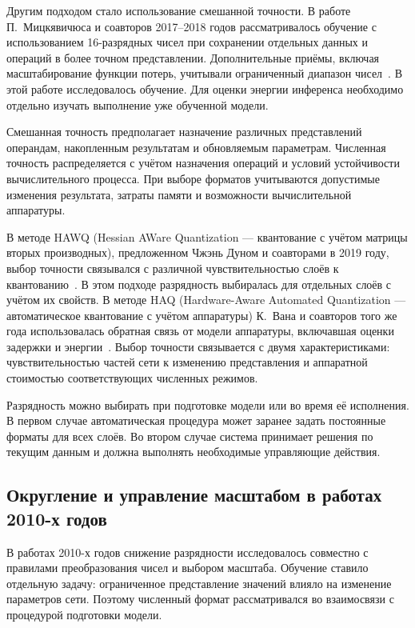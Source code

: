 Другим подходом стало использование смешанной точности. В работе
П.~Мицкявичюса и соавторов 2017--2018 годов рассматривалось
обучение с использованием 16-разрядных чисел при сохранении
отдельных данных и операций в более точном представлении.
Дополнительные приёмы, включая масштабирование функции потерь,
учитывали ограниченный диапазон чисел~\cite{mixed2018}.
В этой работе исследовалось обучение. Для оценки энергии инференса необходимо
отдельно изучать выполнение уже обученной модели.

Смешанная точность предполагает назначение различных представлений
операндам, накопленным результатам и обновляемым параметрам.
Численная точность распределяется с учётом назначения операций
и условий устойчивости вычислительного процесса. При выборе форматов учитываются допустимые изменения результата, затраты
памяти и возможности вычислительной аппаратуры.

В методе HAWQ (Hessian AWare Quantization — квантование с учётом
матрицы вторых производных), предложенном Чжэнь Дуном и соавторами
в 2019 году, выбор точности связывался с различной
чувствительностью слоёв к квантованию~\cite{hawq2019}.
В этом подходе разрядность выбиралась для отдельных слоёв
с учётом их свойств. В методе HAQ
(Hardware-Aware Automated Quantization — автоматическое квантование
с учётом аппаратуры) К.~Вана и соавторов того же года использовалась
обратная связь от модели аппаратуры, включавшая оценки задержки
и энергии~\cite{haq2019}.
Выбор точности связывается с двумя характеристиками:
чувствительностью частей сети к изменению представления
и аппаратной стоимостью соответствующих численных режимов.

Разрядность можно выбирать при подготовке модели или во время её исполнения. В
первом случае автоматическая процедура может заранее задать постоянные форматы
для всех слоёв. Во втором случае система принимает решения по текущим данным и
должна выполнять необходимые управляющие действия.

\subsection{Округление и управление масштабом в работах 2010-х годов}

В работах 2010-х годов снижение разрядности исследовалось
совместно с правилами преобразования чисел и выбором масштаба.
Обучение ставило отдельную задачу: ограниченное представление
значений влияло на изменение параметров сети.
Поэтому численный формат рассматривался во взаимосвязи
с процедурой подготовки модели.

